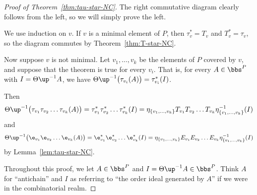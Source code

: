 \begin{proof}[Proof of Theorem~\ref{thm:tau-star-NC}]
The right commutative diagram clearly follows from the left, so we will simply prove the left.

We use induction on $v$. If $v$ is a minimal element of $P$, then $\tau_v^*=T_v$ and $T_v^*=\tau_v$, so the diagram commutes by Theorem~\ref{thm:T-star-NC}.

Now suppose $v$ is not minimal. Let $v_1,\dots,v_k$ be the elements of $P$ covered by $v$, and suppose that the theorem is true for every $v_i$. That is, for every $A\in\bbs^P$ with $I=\Theta\up^{-1}A$, we have $\Theta\up^{-1}\big(\tau_{v_i}(A)\big)=\tau_{v_i}^*(I)$.

Then 
\[
\Theta\up^{-1}\big(\tau_{v_1}\tau_{v_2}\dots \tau_{v_k}(A)\big)=\tau_{v_1}^*\tau_{v_2}^*\dots \tau_{v_k}^*(I)
= \eta_{\{v_1,\dots,v_k\}} T_{v_1}T_{v_2}\dots T_{v_k} \eta_{\{v_1,\dots,v_k\}}^{-1}(I)
\]
and 
\[
\Theta\up^{-1}\big(\e_{v_1}\e_{v_2}\dots \e_{v_k}(A)\big)=\e_{v_1}^*\e_{v_2}^*\dots \e_{v_k}^*(I)
= \eta_{\{v_1,\dots,v_k\}} E_{v_1}E_{v_2}\dots E_{v_k} \eta_{\{v_1,\dots,v_k\}}^{-1}(I)
\]
by Lemma~\ref{lem:tau-star-NC}.

Throughout this proof, we let $A\in\bbs^P$ and
$I=\Theta\up^{-1}A\in\bbs^P$. Think $A$ for ``antichain'' and $I$ as referring to ``the order ideal generated by $A$''
if we were in the combinatorial realm.


\end{proof}
